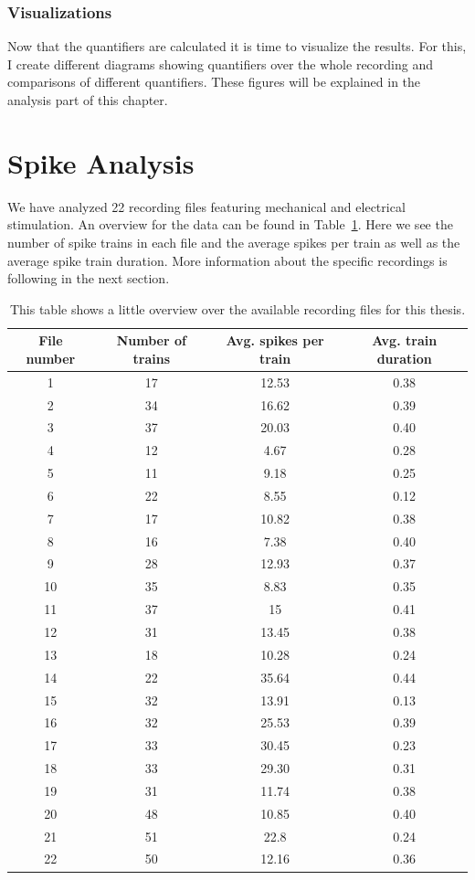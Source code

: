 \subsubsection{Visualizations}
Now that the quantifiers are calculated it is time to visualize the results. For this, I create different diagrams showing quantifiers over the whole recording and comparisons of different quantifiers. These figures will be explained in the analysis part of this chapter.\\



\section{Spike Analysis}
We have analyzed 22 recording files featuring  mechanical and electrical stimulation. An overview for the data can be found in  Table~\ref{table:recording_overview}. Here we see the number of spike trains in each file and the average spikes per train as well as the average spike train duration. More information about the specific recordings is following in the next section.

\begin{table}[!ht]
\centering
\begin{tabular}{ |c|c|c|c| }
	\hline
	File number & Number of trains  & Avg. spikes per train & Avg. train duration\\
	\hline
	1 & 17 & 12.53 & 0.38 \\
	2 & 34 & 16.62 & 0.39 \\
	3 & 37 & 20.03 & 0.40 \\
	4 & 12 & 4.67 & 0.28 \\
	5 & 11 & 9.18 & 0.25 \\
	6 & 22 & 8.55 & 0.12 \\
	7 & 17 & 10.82 & 0.38 \\
	8 & 16 & 7.38 & 0.40 \\
	9 & 28 & 12.93 & 0.37 \\
	10 & 35 & 8.83 & 0.35 \\
	11 & 37 & 15 & 0.41 \\
	12 & 31 & 13.45 & 0.38 \\
	13 & 18 & 10.28 & 0.24 \\
	14 & 22 & 35.64 & 0.44 \\
	15 & 32 & 13.91 & 0.13 \\
	16 & 32 & 25.53 & 0.39 \\
	17 & 33 & 30.45 & 0.23 \\
	18 & 33 & 29.30 & 0.31 \\
	19 & 31 & 11.74 & 0.38 \\
	20 & 48 & 10.85 & 0.40 \\
	21 & 51 & 22.8 & 0.24 \\
	22 & 50 & 12.16 & 0.36\\
	\hline
\end{tabular}
\caption{This table shows a little overview over the available recording files for this thesis.}
\label{table:recording_overview}
\end{table}

